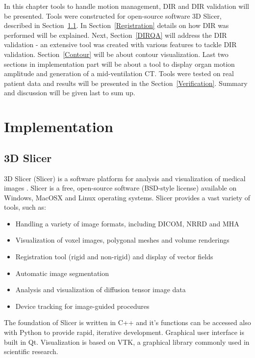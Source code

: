 \documentclass[type=dr, dr=rernat, accentcolor=tud7b,colorbacktitle, bigchapter, openright, twoside, 12pt ]{tudthesis}
\begin{document}
In this chapter tools to handle motion management, DIR and DIR validation will be presented. Tools were constructed for open-source software 3D Slicer, described in Section~\ref{Slicer}. In Section~\ref{Registration} details on how DIR was performed will be explained. Next, Section~\ref{DIRQA} will address the DIR validation - an extensive tool was created with various features to tackle DIR validation. Section~\ref{Contour} will be about contour visualization. Last two sections in implementation part will be about a tool to display organ motion amplitude and generation of a mid-ventilation CT. Tools were tested on real patient data and results will be presented in the Section~\ref{Verification}. Summary and discussion will be given last to sum up.

\section{Implementation}
\label{Implementation}

\subsection{3D Slicer}
\label{Slicer}

3D Slicer (Slicer) is a software platform for analysis and visualization of medical images \cite{Slicer, Fedorov2012}. Slicer is a free, open-source software (BSD-style license) available on Windows, MacOSX and Linux operating systems. Slicer provides a vast variety of tools, such as:

\begin{itemize}
	\item Handling a variety of image formats, including DICOM, NRRD and MHA
	\item Visualization of voxel images, polygonal meshes and volume renderings
	\item Registration tool (rigid and non-rigid) and display of vector fields
	\item Automatic image segmentation
	\item Analysis and visualization of diffusion tensor image data
	\item Device tracking for image-guided procedures
\end{itemize}

The foundation of Slicer is written in C++ and it's functions can be accessed also with Python to provide rapid, iterative development. Graphical user interface is built in Qt. Visualization is based on VTK, a graphical library commonly used in scientific research.
\end{document}
